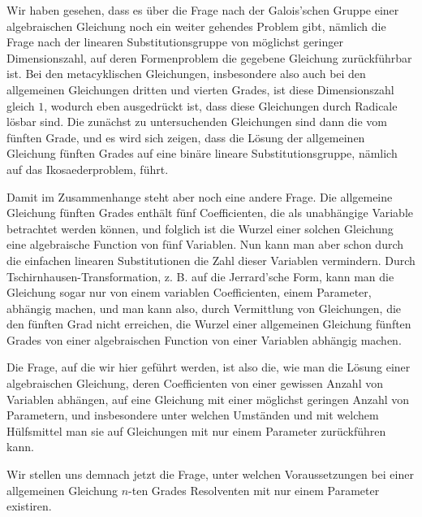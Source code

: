 \documentclass[11pt]{article}
\begin{document}
Wir haben gesehen, dass es über die Frage nach der Galois'schen Gruppe einer algebraischen Gleichung noch ein weiter gehendes Problem gibt, nämlich die Frage nach der linearen Substitutionsgruppe von möglichst geringer Dimensionszahl, auf deren Formenproblem die gegebene Gleichung zurückführbar ist. Bei den metacyklischen Gleichungen, insbesondere also auch bei den allgemeinen Gleichungen dritten und vierten Grades, ist diese Dimensionszahl gleich \(1\), wodurch eben ausgedrückt ist, dass diese Gleichungen durch Radicale lösbar sind. Die zunächst zu untersuchenden Gleichungen sind dann die vom fünften Grade, und es wird sich zeigen, dass die Lösung der allgemeinen Gleichung fünften Grades auf eine binäre lineare Substitutionsgruppe, nämlich auf das Ikosaederproblem, führt.

Damit im Zusammenhange steht aber noch eine andere Frage. Die allgemeine Gleichung fünften Grades enthält fünf Coefficienten, die als unabhängige Variable betrachtet werden können, und folglich ist die Wurzel einer solchen Gleichung eine algebraische Function von fünf Variablen. Nun kann man aber schon durch die einfachen linearen Substitutionen die Zahl dieser Variablen vermindern. Durch Tschirnhausen-Transformation, z. B. auf die Jerrard'sche Form, kann man die Gleichung sogar nur von einem variablen Coefficienten, einem Parameter, abhängig machen, und man kann also, durch Vermittlung von Gleichungen, die den fünften Grad nicht erreichen, die Wurzel einer allgemeinen Gleichung fünften Grades von einer algebraischen Function von einer Variablen abhängig machen.

Die Frage, auf die wir hier geführt werden, ist also die, wie man die Lösung einer algebraischen Gleichung, deren Coefficienten von einer gewissen Anzahl von Variablen abhängen, auf eine Gleichung mit einer möglichst geringen Anzahl von Parametern, und insbesondere unter welchen Umständen und mit welchem Hülfsmittel man sie auf Gleichungen mit nur einem Parameter zurückführen kann.

Wir stellen uns demnach jetzt die Frage, unter welchen Voraussetzungen bei einer allgemeinen Gleichung \(n\)-ten Grades Resolventen mit nur einem Parameter existiren.
\end{document}
